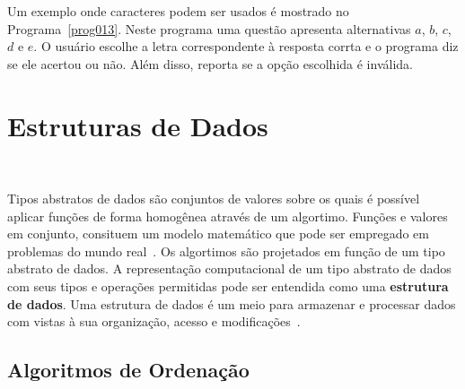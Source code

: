 \documentclass[11pt,fleqn]{book} %
\begin{document}
Um exemplo onde caracteres podem ser usados é mostrado no Programa~\ref{prog013}.
Neste programa uma questão apresenta alternativas $a$, $b$, $c$, $d$ e $e$. 
O usuário escolhe a letra correspondente à resposta corrta e o programa diz se ele acertou ou não. 
Além disso, reporta se a opção escolhida é inválida.


\chapter{Estruturas de Dados}\label{estrutura}
\vspace{6em}
\begin{flushright}
	\textit{\textcolor{white}{Um bonita citação...}}
\end{flushright}
\vspace{12em}

Tipos abstratos de dados são conjuntos de valores sobre os quais é possível aplicar funções de forma homogênea através de um algortimo.
Funções e valores em conjunto, consituem um modelo matemático que pode ser empregado em problemas do mundo real~\cite{ascencio2010}.
Os algortimos são projetados em função de um tipo abstrato de dados.
A representação computacional de um tipo abstrato de dados com seus tipos e operações permitidas pode ser entendida como uma \textbf{estrutura de dados}.
Uma estrutura de dados é um meio para armazenar e processar dados com vistas à sua organização, acesso e modificações~\cite{cormen2009}.

\section{Algoritmos de Ordenação}\label{ordenacao}
\end{document}
